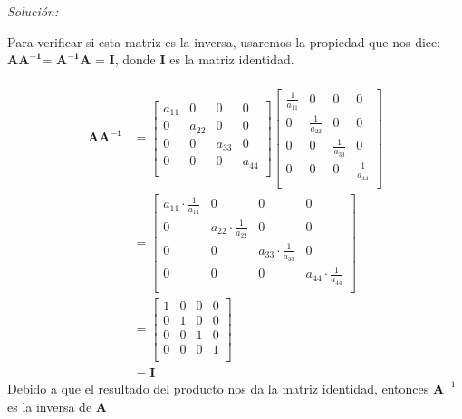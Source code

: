 \documentclass[12pt]{article}
\newenvironment{sol}
    {\emph{Solución:}
    }
    {
    }
\begin{document}
\begin{sol}
Para verificar si esta matriz es la inversa, usaremos la propiedad que nos dice:
$\mathbf{AA^{-1}}$= $\mathbf{A^{-1}A}$ = \textbf{I}, donde \textbf{I} es la matriz identidad.\\ \\
\begin{align*}
\mathbf{AA^{-1}} &=
\begin{bmatrix}
a_{11} & 0 & 0 & 0 \\
0 & a_{22} & 0 & 0 \\
0 & 0 & a_{33} & 0 \\
0 & 0 & 0 & a_{44} \\
\end{bmatrix}
\begin{bmatrix}
\frac{1}{a_{11}} & 0 & 0 & 0 \\
0 & \frac{1}{a_{22}} & 0 & 0 \\
0 & 0 & \frac{1}{a_{33}} & 0 \\
0 & 0 & 0 & \frac{1}{a_{44}} \\
\end{bmatrix} \\
&= 
\begin{bmatrix}
a_{11} \cdot \frac{1}{a_{11}} & 0 & 0 & 0 \\
0 & a_{22} \cdot\frac{1}{a_{22}} & 0 & 0 \\
0 & 0 & a_{33} \cdot\frac{1}{a_{33}} & 0 \\
0 & 0 & 0 & a_{44} \cdot\frac{1}{a_{44}} \\
\end{bmatrix}\\
&=
\begin{bmatrix}
1 & 0 & 0 & 0 \\
0 & 1 & 0 & 0 \\
0 & 0 & 1 & 0 \\
0 & 0 & 0 & 1 \\
\end{bmatrix} \\
&= \mathbf{I}
\end{align*}
Debido a que el resultado del producto nos da la matriz identidad, entonces $\mathbf{A}^{-1}$ es la inversa de \textbf{A} 
\end{sol}

\pagebreak
\end{document}
